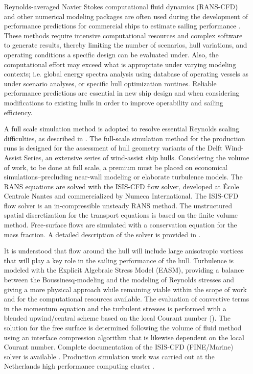 \documentclass[twoside,twocolumn]{article}
\begin{document}
Reynolds-averaged Navier Stokes computational fluid dynamics (RANS-CFD) and other numerical modeling packages are often used during the development of performance predictions for commercial ships to estimate sailing performance \citep{Tezdogan2015,Eggers16,Kolk18c}. These methods require intensive computational resources and complex software to generate results, thereby limiting the number of scenarios, hull variations, and operating conditions a specific design can be evaluated under. Also, the computational effort may exceed what is appropriate under varying modeling contexts; i.e. global energy spectra analysis using database of operating vessels as under scenario analyses, or specific hull optimization routines. Reliable performance predictions are essential in new ship design and when considering modifications to existing hulls in order to improve operability and sailing efficiency. 

A full scale simulation method is adopted to resolve essential Reynolds scaling difficulties, as described in \cite{Kolk19d}. The full-scale simulation method for the production runs is designed for the assessment of hull geometry variants of the Delft Wind-Assist Series, an extensive series of wind-assist ship hulls. Considering the volume of work, to be done at full scale, a premium must be placed on economical simulations--precluding near-wall modeling or elaborate turbulence models. The RANS equations are solved with the ISIS-CFD flow solver, developed at \'{E}cole Centrale Nantes and commercialized by Numeca International. The ISIS-CFD flow solver is an in-compressible unsteady RANS method. The unstructured spatial discretization for the transport equations is based on the finite volume method. Free-surface flows are simulated with a conservation equation for the mass fraction. A detailed description of the solver is provided in \cite{Den05,Den06,Que07,Duv03}.

It is understood that flow around the hull will include large anisotropic vortices that will play a key role in the sailing performance of the hull. Turbulence is modeled with the Explicit Algebraic Stress Model (EASM), providing a balance between the Boussinesq-modeling and the modeling of Reynolds stresses and giving a more physical approach while remaining viable within the scope of work and for the computational resources available. The evaluation of convective terms in the momentum equation and the turbulent stresses is performed with a blended upwind/central scheme based on the local Courant number (\Co). The solution for the free surface is determined following the volume of fluid method using an interface compression algorithm that is likewise dependent on the local Courant number. Complete documentation of the ISIS-CFD (FINE/Marine) solver is available \cite{Numeca1}. Production simulation work was carried out at the Netherlands high performance computing cluster \cite{SARA1}.
\end{document}
